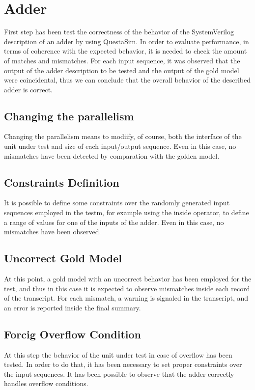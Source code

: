 %
 
\chapter{Adder}
\label{cha2}

First step has been test the correctness of the behavior of the SystemVerilog description of
an adder by using QuestaSim.
In order to evaluate performance, in terms of coherence with the expected behavior, it is needed
to check the amount of matches and mismatches.
For each input sequence, it was observed that the output of the adder description to be tested
and the output of the gold model were coincidental, thus we can conclude that the overall 
behavior of the described adder is correct.

\section{Changing the parallelism}
Changing the parallelism means to modiify, of course, both the interface of the unit under test and
size of each input/output sequence.
Even in this case, no mismatches have been detected by comparation with the golden model.

\section{Constraints Definition}
It is possible to define some constraints over the randomly generated input sequences 
employed in the testm, for example using the inside operator, to define a range of values
for one of the inputs of the adder.
Even in this case, no mismatches have been observed.

\section{Uncorrect Gold Model}
At this point, a gold model with an uncorrect behavior has been employed for the test, and thus
in this case it is expected to observe mismatches inside each record of the transcript.
For each mismatch, a warning is signaled in the transcript, and an error is reported inside
the final summary.

\section{Forcig Overflow Condition}
At this step the behavior of the unit under test in case of overflow has been tested.
In order to do that, it has been necessary to set proper constraints over the input sequences.
It has been possible to observe that the adder correctly handles overflow conditions.
